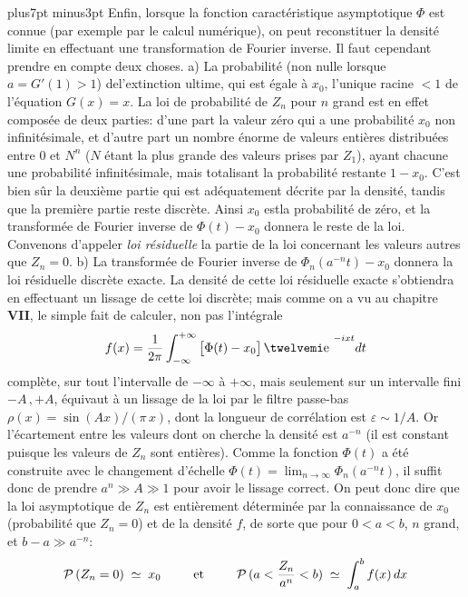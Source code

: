\vskip7pt plus7pt minus3pt
Enfin,  lorsque la fonction caract\'eristique asymptotique $\Phi$ est
connue (par exemple par le calcul num\'erique),  on peut reconstituer la
densit\'e limite en effectuant une transformation de Fourier inverse.
Il faut cependant prendre en compte deux choses. 
\medskip
a) \xsp  La probabilit\'e (non nulle lorsque
$a = G'(1) > 1$) del'extinction ultime,  qui est \'egale \`a $x_0$,  l'unique racine
$< 1$ de l'\'equation $G(x) = x$.  La loi de probabilit\'e de $Z_n$ 
pour $n$ grand est en effet compos\'ee de deux parties:  d'une part la
valeur z\'ero qui a une probabilit\'e $x_0$ non infinit\'esimale, 
et
d'autre part un nombre \'enorme de valeurs enti\`eres distribu\'ees
entre $0$ et $N^n$ ($N$ \'etant la plus grande des valeurs prises par
$Z_1$),  ayant chacune une probabilit\'e infinit\'esimale,  mais
totalisant la probabilit\'e restante $1 - x_0$.  C'est bien s\^ur la
deuxi\`eme partie qui est ad\'equatement d\'ecrite par la densit\'e,
tandis que la premi\`ere partie reste discr\`ete.
 Ainsi $x_0$ estla probabilit\'e de z\'ero,  et la transform\'ee de Fourier inverse
de $\Phi(t) - x_0$ donnera le reste de la loi.  Convenons d'appeler
{\it loi r\'esiduelle} la partie de la loi concernant les valeurs autres
que $Z_n = 0$. 
\medskip
b) La transform\'ee de Fourier inverse de $\Phi_n(a^{-n}t) - x_0$ donnera
la loi r\'esiduelle discr\`ete exacte.  La densit\'e de cette loi
r\'esiduelle exacte s'obtiendra en effectuant un lissage de cette loi
discr\`ete;  mais comme on a vu au chapitre {\bf VII},  le simple
fait de calculer,  non pas l'int\'egrale 
$$f(x) = {1 \over 2\pi }\int_{-\infty}^{+\infty}
\big[ \Phi (t) - x_0 \big]\,\e^{-ixt} dt$$
compl\`ete,  sur tout l'intervalle de $-\infty$ \`a $+\infty$, 
mais seulement sur un intervalle fini $-A\, , +A$,  \'equivaut \`a un
lissage de la loi par le filtre passe-bas $\rho(x) = \sin(Ax) \Big/
(\pi\, x)$,  dont la longueur de corr\'elation est $\varepsilon \sim 1/A$. 
Or l'\'ecartement entre les valeurs dont on cherche la densit\'e est
$a^{-n}$  (il est constant puisque les valeurs de $Z_n$ sont enti\`eres). 
Comme la fonction $\Phi(t)$ a \'et\'e construite avec le changement
d'\'echelle $\Phi(t) = \lim_{n \to \infty}\Phi_n(a^{-n}t)$,  il suffit
donc de prendre $a^{n} \gg A \gg 1$ pour avoir le lissage correct. 
\medskip
On peut donc dire que la loi asymptotique de $Z_n$ est enti\`erement
d\'etermin\'ee par la connaissance de $x_0$ (probabilit\'e que $Z_n = 
0$) et de la densit\'e $f$,  de sorte que pour $0 < a < b$,  $n$ grand, 
et $b-a \gg a^{-n}$:
$${\cal P}\, (Z_n = 0) \; \simeq \; x_0 \hskip9mm \hbox{et} \hskip9mm
{\cal P}\, (a < {Z_n \over a^n} < b) \; \simeq \; \int_a^b f(x) \, dx$$
